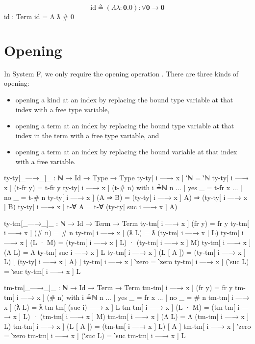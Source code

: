 \documentclass[logo,bsc,singlespacing,parskip,online]{infthesis}
\renewenvironment{code}{\mintedcopy[breaklines,breaksymbolleft=\;]{agda}}{\endmintedcopy}
\begin{document}
\begin{equation*}
  \text{id} \triangleq (\Lambda \lambda \colon \mathbf{0}. 0) \colon \forall \mathbf{0} \to \mathbf{0}
\end{equation*}
\begin{code}
  id : Term
  id = Λ ƛ # 0
\end{code}

\section{Opening}
In System F, we only require the opening operation \citep{chargueraud_locally_2012}. There are three
kinds of opening:
\begin{itemize}
  \item opening a kind at an index by replacing the bound type variable at that index with a free
        type variable,
  \item opening a term at an index by replacing the bound type variable at that index in the term
        with a free type variable, and
  \item opening a term at an index by replacing the bound variable at that index with a free
        variable.
\end{itemize}

\begin{code}
  ty-ty[_—→_]_ : ℕ → Id → Type → Type
  ty-ty[ i —→ x ] ‵ℕ = ‵ℕ
  ty-ty[ i —→ x ] (t-fr y) = t-fr y
  ty-ty[ i —→ x ] (t-# n) with i ≟ℕ n
  ... | yes _ = t-fr x
  ... | no  _ = t-# n
  ty-ty[ i —→ x ] (A ⇒ B) = (ty-ty[ i —→ x ] A) ⇒ (ty-ty[ i —→ x ] B)
  ty-ty[ i —→ x ] t-∀ A = t-∀ (ty-ty[ suc i —→ x ] A)

  ty-tm[_—→_]_ : ℕ → Id → Term → Term
  ty-tm[ i —→ x ] (fr y) = fr y
  ty-tm[ i —→ x ] (# n) = # n
  ty-tm[ i —→ x ] (ƛ L) = ƛ (ty-tm[ i —→ x ] L)
  ty-tm[ i —→ x ] (L · M) = (ty-tm[ i —→ x ] L) · (ty-tm[ i —→ x ] M)
  ty-tm[ i —→ x ] (Λ L) = Λ ty-tm[ suc i —→ x ] L
  ty-tm[ i —→ x ] (L [ A ]) = (ty-tm[ i —→ x ] L) [ (ty-ty[ i —→ x ] A) ]
  ty-tm[ i —→ x ] ‵zero = ‵zero
  ty-tm[ i —→ x ] (‵suc L) = ‵suc ty-tm[ i —→ x ] L

  tm-tm[_—→_]_ : ℕ → Id → Term → Term
  tm-tm[ i —→ x ] (fr y) = fr y
  tm-tm[ i —→ x ] (# n) with i ≟ℕ n
  ... | yes _ = fr x
  ... | no  _ = # n
  tm-tm[ i —→ x ] (ƛ L) = ƛ tm-tm[ (suc i) —→ x ] L
  tm-tm[ i —→ x ] (L · M) = (tm-tm[ i —→ x ] L) · (tm-tm[ i —→ x ] M)
  tm-tm[ i —→ x ] (Λ L) = Λ (tm-tm[ i —→ x ] L)
  tm-tm[ i —→ x ] (L [ A ]) = (tm-tm[ i —→ x ] L) [ A ]
  tm-tm[ i —→ x ] ‵zero = ‵zero
  tm-tm[ i —→ x ] (‵suc L) = ‵suc tm-tm[ i —→ x ] L
\end{code}
\end{document}
